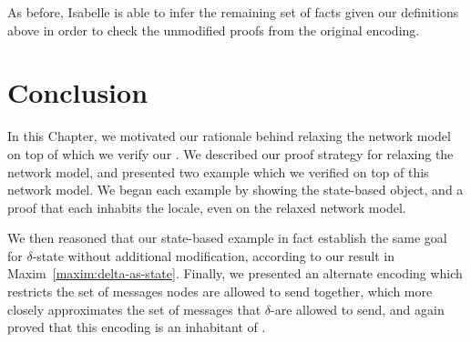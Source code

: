 As before, Isabelle is able to infer the remaining set of facts given our
definitions above in order to check the unmodified proofs from the original
encoding.

\section{Conclusion}

In this Chapter, we motivated our rationale behind relaxing the network model
on top of which we verify our \CRDTs. We described our proof strategy for
relaxing the network model, and presented two example \CRDTs which we verified
on top of this network model. We began each example by showing the state-based
object, and a proof that each \CRDT inhabits the \SEC locale, even on the
relaxed network model.

We then reasoned that our state-based example \CRDTs in fact establish the same
goal for $\delta$-state \CRDTs without additional modification, according to our
result in Maxim~\ref{maxim:delta-as-state}. Finally, we presented an alternate
encoding which restricts the set of messages nodes are allowed to send together,
which more closely approximates the set of messages that $\delta$-\CRDTs are
allowed to send, and again proved that this encoding is an inhabitant of \SEC.
